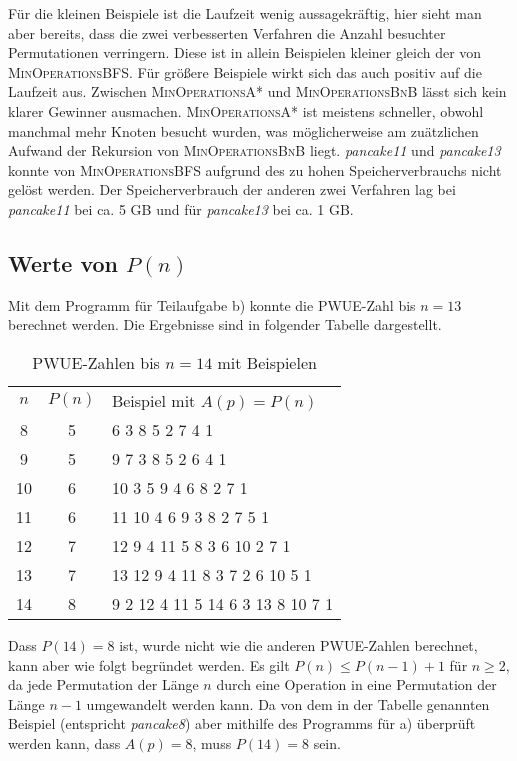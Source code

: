 \documentclass[a4paper, 10pt, ngerman]{article}
\begin{document}
Für die kleinen Beispiele ist die Laufzeit wenig aussagekräftig, hier sieht man aber bereits, dass die zwei verbesserten Verfahren die Anzahl besuchter Permutationen verringern. Diese ist in allein Beispielen kleiner gleich der von \textsc{MinOperationsBFS}. Für größere Beispiele wirkt sich das auch positiv auf die Laufzeit aus. Zwischen \textsc{MinOperationsA*} und \textsc{MinOperationsBnB} lässt sich kein klarer Gewinner ausmachen. \textsc{MinOperationsA*} ist meistens schneller, obwohl manchmal mehr Knoten besucht wurden, was möglicherweise am zuätzlichen Aufwand der Rekursion von \textsc{MinOperationsBnB} liegt. \emph{pancake11} und \emph{pancake13} konnte von \textsc{MinOperationsBFS} aufgrund des zu hohen Speicherverbrauchs nicht gelöst werden. Der Speicherverbrauch der anderen zwei Verfahren lag bei \emph{pancake11} bei ca. 5 GB und für \emph{pancake13} bei ca. 1 GB.

\subsection{Werte von $P(n)$}

Mit dem Programm für Teilaufgabe b) konnte die PWUE-Zahl bis $n = 13$ berechnet werden. Die Ergebnisse sind in folgender Tabelle dargestellt.

\begin{table}[H]
    \centering
    \begin{tabular}{c c l}
        \toprule
        $n$ & $P(n)$ & Beispiel mit $A(p) = P(n)$       \\
        \cmidrule{1-3}
        8   & 5      & 6 3 8 5 2 7 4 1                  \\
        9   & 5      & 9 7 3 8 5 2 6 4 1                \\
        10  & 6      & 10 3 5 9 4 6 8 2 7 1             \\
        11  & 6      & 11 10 4 6 9 3 8 2 7 5 1          \\
        12  & 7      & 12 9 4 11 5 8 3 6 10 2 7 1       \\
        13  & 7      & 13 12 9 4 11 8 3 7 2 6 10 5 1    \\
        14  & 8      & 9 2 12 4 11 5 14 6 3 13 8 10 7 1 \\
        \bottomrule
    \end{tabular}
    \caption{PWUE-Zahlen bis $n = 14$ mit Beispielen}
\end{table}

Dass $P(14) = 8$ ist, wurde nicht wie die anderen PWUE-Zahlen berechnet, kann aber wie folgt begründet werden. Es gilt $P(n) \le P(n - 1) + 1$ für $n \ge 2$, da jede Permutation der Länge $n$ durch eine Operation in eine Permutation der Länge $n - 1$ umgewandelt werden kann. Da von dem in der Tabelle genannten Beispiel (entspricht \emph{pancake8}) aber mithilfe des Programms für a) überprüft werden kann, dass $A(p) = 8$, muss $P(14) = 8$ sein.
\medskip
\end{document}
